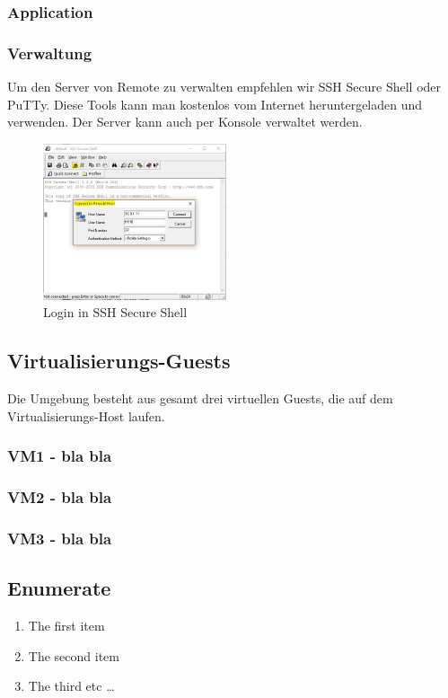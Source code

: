 \documentclass[a4,12pt]{scrartcl}
\begin{document}
\subsubsection{Application}

\newpage
\subsubsection{Verwaltung}
Um den Server von Remote zu verwalten empfehlen wir SSH Secure Shell oder PuTTy. Diese Tools kann man kostenlos vom Internet heruntergeladen und verwenden. Der Server kann auch per Konsole verwaltet werden.
\begin{figure} [H]
\begin{center}
\includegraphics[width=0.48\textwidth]{./pictures/ssh_login.jpg}
\caption{Login in SSH Secure Shell}
\end{center}
\end{figure}

\subsection{Virtualisierungs-Guests}
Die Umgebung besteht aus gesamt drei virtuellen Guests, die auf dem Virtualisierungs-Host laufen.
\subsubsection{VM1 - bla bla}
\subsubsection{VM2 - bla bla}
\subsubsection{VM3 - bla bla}
\newpage
\subsection{Enumerate}
\begin{enumerate}
  \item The first item
  \item The second item
  \item The third etc \ldots
\end{enumerate}
\end{document}
